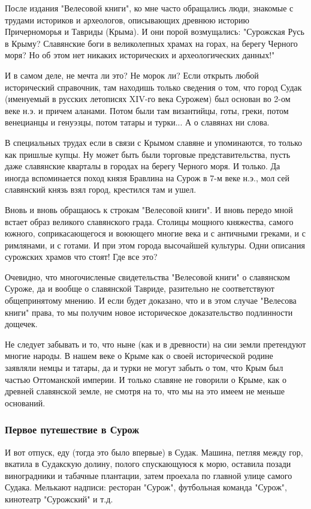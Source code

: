 После издания "Велесовой книги", ко мне часто обращались люди, зна­комые с
трудами историков и археологов, описывающих древнюю историю Причерноморья и
Тавриды (Крыма). И они порой возмущались: "Сурожская Русь в Крыму? Славянские
боги в великолепных храмах на горах, на берегу Черного моря? Но об этом нет
никаких исторических и археологических данных!"

И в самом деле, не мечта ли это? Не морок ли? Если открыть любой исторический
справочник, там находишь только сведения о том, что город Судак (именуемый в
русских летописях XIV-го века Сурожем) был основан во 2-ом веке н.э. и причем
аланами. Потом были там византийцы, готы, греки, потом венецианцы и генуэзцы,
потом татары и турки... А о славянах ни слова.

В специальных трудах если в связи с Крымом славяне и упо­минаются, то только
как пришлые купцы. Ну может быть были торговые пред­ставительства, пусть даже
славянские кварталы в городах на берегу Черного моря. И только. Да иногда
вспоминается поход князя Бравлина на Сурож в 7-м веке н.э., мол сей славянский
князь взял город, крестился там и ушел.

Вновь и вновь обращаюсь к строкам "Велесовой книги". И вновь передо мной встает
образ великого славянского града. Столицы мощного кня­жества, самого южного,
соприкасающегося и воюющего многие века и с античными греками, и с римлянами, и
с готами. И при этом города высочайшей культуры. Одни описания сурожских храмов
что стоят! Где все это?

Очевидно, что многочисленые свидетельства "Велесовой книги" о славян­ском
Суроже, да и вообще о славянской Тавриде, разительно не со­от­вет­ствуют
общепринятому мнению. И если будет доказано, что и в этом случае "Велесова
книги" права, то мы получим новое историческое до­ка­зательство подлинности
дощечек.

Не следует забывать и то, что ныне (как и в древности) на сии земли претендуют
многие народы. В нашем веке о Крыме как о своей ис­то­ри­ческой родине заявляли
немцы и татары, да и турки не могут забыть о том, что Крым был частью
Оттоманской империи. И только славяне не говорили о Крыме, как о древней
славянской земле, не смотря на то, что мы на это имеем не меньше оснований.

\subsubsection{Первое путешествие в Сурож}


И вот отпуск, еду (тогда это было впервые) в Судак. Машина, петляя между гор,
вкатила в Су­дакскую долину, полого спускающуюся к морю, оставила позади
вино­градники и табачные плантации, затем проехала по главной улице самого
Судака. Мелькают надписи: ресторан "Сурож", футбольная команда "Сурож",
кинотеатр "Сурожский" и т.д.

